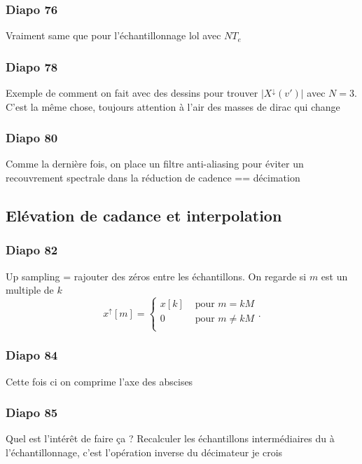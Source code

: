 \documentclass{article}
\theoremstyle{plain}%
\theoremstyle{definition}
\theoremstyle{remark}
\begin{document}
\subsubsection{Diapo 76}
Vraiment same que pour l'échantillonnage lol avec $ N T_e $ 

\subsubsection{Diapo 78}
Exemple de comment on fait avec des dessins pour trouver $ \left| X^{\downarrow }(v') \right|  $ avec $ N = 3 $. C'est la même chose, toujours attention à l'air des masses de dirac qui change

\subsubsection{Diapo 80}
Comme la dernière fois, on place un filtre anti-aliasing pour éviter un recouvrement spectrale dans la réduction de cadence == décimation

\subsection{Elévation de cadance et interpolation}
\subsubsection{Diapo 82}
Up sampling = rajouter des zéros entre les échantillons. On regarde si $ m $ est un multiple de $ k $ 
\[
    x^{\uparrow } [m] = \begin{cases}
    x[k] &\text{ pour } m = kM\\
    0 &\text{ pour } m \neq kM\\
    \end{cases} 
.\]

\subsubsection{Diapo 84}
Cette fois ci on comprime l'axe des abscises

\subsubsection{Diapo 85}
Quel est l'intérêt de faire ça ? Recalculer les échantillons intermédiaires du à l'échantillonnage, c'est l'opération inverse du décimateur je crois 
\end{document}
